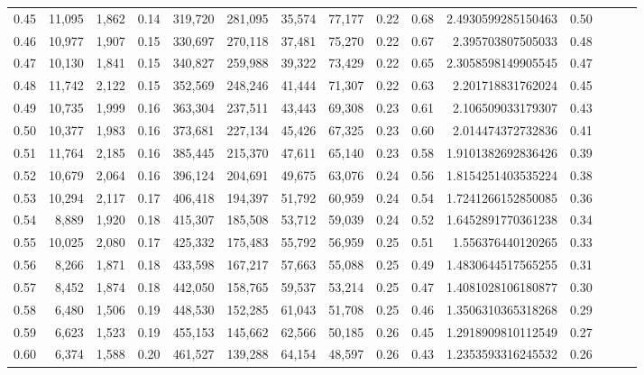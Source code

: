 \begin{tabular}{rrrrrrrrrrrrrrr}
0.45 &  11,095 &  1,862 &  0.14 &  319,720 &  281,095 &   35,574 &   77,177 &  0.22 &  0.68 &    2.4930599285150463 &      0.50 \\
0.46 &  10,977 &  1,907 &  0.15 &  330,697 &  270,118 &   37,481 &   75,270 &  0.22 &  0.67 &     2.395703807505033 &      0.48 \\
0.47 &  10,130 &  1,841 &  0.15 &  340,827 &  259,988 &   39,322 &   73,429 &  0.22 &  0.65 &    2.3058598149905545 &      0.47 \\
0.48 &  11,742 &  2,122 &  0.15 &  352,569 &  248,246 &   41,444 &   71,307 &  0.22 &  0.63 &     2.201718831762024 &      0.45 \\
0.49 &  10,735 &  1,999 &  0.16 &  363,304 &  237,511 &   43,443 &   69,308 &  0.23 &  0.61 &     2.106509033179307 &      0.43 \\
0.50 &  10,377 &  1,983 &  0.16 &  373,681 &  227,134 &   45,426 &   67,325 &  0.23 &  0.60 &     2.014474372732836 &      0.41 \\
0.51 &  11,764 &  2,185 &  0.16 &  385,445 &  215,370 &   47,611 &   65,140 &  0.23 &  0.58 &    1.9101382692836426 &      0.39 \\
0.52 &  10,679 &  2,064 &  0.16 &  396,124 &  204,691 &   49,675 &   63,076 &  0.24 &  0.56 &    1.8154251403535224 &      0.38 \\
0.53 &  10,294 &  2,117 &  0.17 &  406,418 &  194,397 &   51,792 &   60,959 &  0.24 &  0.54 &    1.7241266152850085 &      0.36 \\
0.54 &   8,889 &  1,920 &  0.18 &  415,307 &  185,508 &   53,712 &   59,039 &  0.24 &  0.52 &    1.6452891770361238 &      0.34 \\
0.55 &  10,025 &  2,080 &  0.17 &  425,332 &  175,483 &   55,792 &   56,959 &  0.25 &  0.51 &     1.556376440120265 &      0.33 \\
0.56 &   8,266 &  1,871 &  0.18 &  433,598 &  167,217 &   57,663 &   55,088 &  0.25 &  0.49 &    1.4830644517565255 &      0.31 \\
0.57 &   8,452 &  1,874 &  0.18 &  442,050 &  158,765 &   59,537 &   53,214 &  0.25 &  0.47 &    1.4081028106180877 &      0.30 \\
0.58 &   6,480 &  1,506 &  0.19 &  448,530 &  152,285 &   61,043 &   51,708 &  0.25 &  0.46 &    1.3506310365318268 &      0.29 \\
0.59 &   6,623 &  1,523 &  0.19 &  455,153 &  145,662 &   62,566 &   50,185 &  0.26 &  0.45 &    1.2918909810112549 &      0.27 \\
0.60 &   6,374 &  1,588 &  0.20 &  461,527 &  139,288 &   64,154 &   48,597 &  0.26 &  0.43 &    1.2353593316245532 &      0.26 \\

\end{tabular}

